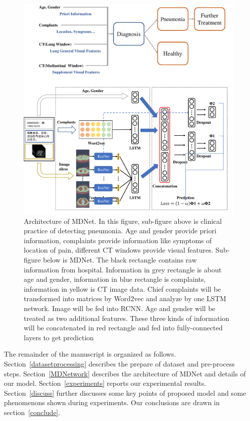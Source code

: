 \documentclass[journal]{IEEEtran}
\begin{document}
\begin{figure}[t]
    \centerline{\includegraphics[width=160mm]{MMDD.pdf}}
    \vspace{-0cm}
    \caption{Architecture of MDNet. 
    In this figure, sub-figure above is clinical practice of detecting pneumonia. Age and gender provide priori information, complaints provide information like symptoms of location of pain, different CT windows provide visual features.
    Sub-figure below is MDNet. The black rectangle contains raw information from hospital. Information in grey rectangle is about age and gender, information in blue rectangle is complaints, information in yellow is CT image data. Chief complaints will be transformed into matrices by Word2vec and analyze by one LSTM network. Image will be fed into RCNN. Age and gender will be treated as two additional features. These three kinds of information will be concatenated in red rectangle and fed into fully-connected layers to get prediction}
    \vspace{-0cm}
    \label{MMDD}
    \end{figure}


The remainder of the manuscript is organized as follows. 
Section~\ref{datasetprocessing} describes the prepare of dataset and pre-process steps.
Section~\ref{MDNetwork} describes the architecture of MDNet and details of our model.
Section~\ref{experiments} reports our experimental results.
Section~\ref{discuss} further discusses some key points of proposed model and some phenomenons shown during experiments.
Our conclusions are drawn in section~\ref{conclude}.
\end{document}
